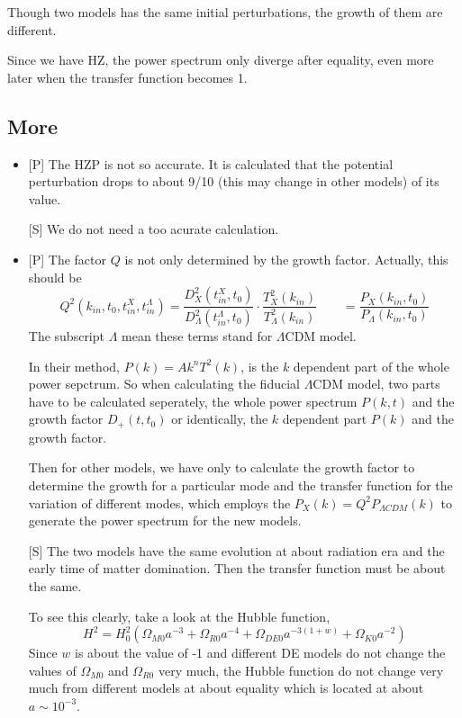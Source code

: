 \documentclass{article}
\begin{document}
Though two models has the same initial perturbations, the growth of them are different.

Since we have HZ, the power spectrum only diverge after equality, even more later when the transfer function becomes 1.






\subsection{More}

\begin{itemize}

\item

[P] The HZP is not so accurate. It is calculated that the potential perturbation drops to about 9/10 (this may change in other models) of its value.

[S] We do not need a too acurate calculation.

\item

[P] The factor $Q$ is not only determined by the growth factor. Actually, this should be
\begin{equation}
Q^2(k_{in},t_0,t^X_{in},t^{\Lambda}_{in})=\frac{D^2_X(t^X_{in},t_0)}{D^2_{\Lambda}(t^{\Lambda}_{in},t_0)}\cdot\frac{T^2_X(k_{in})}{T^2_{\Lambda}(k_{in})}\qquad=\frac{P_X(k_{in},t_0)}{P_{\Lambda}(k_{in},t_0)}
\end{equation}
The subscript $\Lambda$ mean these terms stand for $\Lambda$CDM model.


In their method, $P(k)=Ak^nT^2(k)$, is the $k$ dependent part of the whole power sepctrum. So when calculating the fiducial $\Lambda$CDM model, two parts have to be calculated seperately, the whole power spectrum $P(k,t)$ and the growth factor $D_+(t,t_0)$ or identically, the $k$ dependent part $P(k)$ and the growth factor. 

Then for other models, we have only to calculate the growth factor to determine the growth for a particular mode and the transfer function for the variation of different modes, which employs the $P_X(k)=Q^2P_{\Lambda CDM}(k)$ to generate the power spectrum for the new models.

[S] \label{TransferFunctionSame} The two models have the same evolution at about radiation era and the early time of matter domination. Then the transfer function must be about the same.

To see this clearly, take a look at the Hubble function,
\begin{equation}
H^2=H_0^2(\Omega_{M0}a^{-3}+\Omega_{R0}a^{-4}+\Omega_{DE0}a^{-3(1+w)}+\Omega_{K0}a^{-2})
\end{equation}
Since $w$ is about the value of -1 and different DE models do not change the values of $\Omega_{M0}$ and $\Omega_{R0}$ very much, the Hubble function do not change very much from different models at about equality which is located at about $a\sim 10^{-3}$.


\end{itemize}
\end{document}
